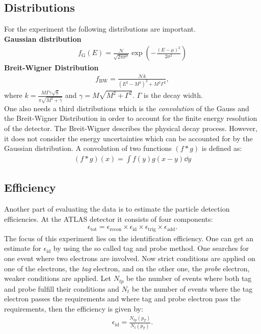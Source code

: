 \documentclass[12pt, a4paper, bibliography=totoc]{scrartcl}
\begin{document}
\begin{multicols}{2}
\subsection{Distributions}
For the experiment the following distributions are important.\\
\textbf{Gaussian distribution}
\begin{align}
    f_{\text{G}} (E) = \frac{\mathcal{N}}{\sqrt{2 \pi \sigma^2}} \exp \left( - \frac{(E - \mu )^2}{2 \sigma^2} \right)
\end{align}
\textbf{Breit-Wigner Distribution}
\begin{align}
    f_{\text{BW}} = \frac{\mathcal{N} k}{(E^2 - M^2)^2 + M^2 \Gamma^2} ,
\end{align}
where $k = \frac{M\Gamma \gamma \sqrt{8}}{\pi \sqrt{M^2 + \gamma}}$ and $\gamma = M \sqrt{M^2 + \Gamma^2}$. $\Gamma$ is the decay width.\\
One also needs a third distributions which is the \textit{convolution} of the Gauss and the Breit-Wigner Distribution in order to account for the finite energy resolution of the detector. 
The Breit-Wigner describes the physical decay process. 
However, it does not consider the energy uncertainties which can be accounted for by the Gaussian distribution.
A convolution of two functions $(f \ast g)$ is defined as:
\begin{align}
    (f \ast g) (x) = \int f(y)g(x-y)\dd y
\end{align}

\subsection{Efficiency}
Another part of evaluating the data is to estimate the particle detection efficiencies.
At the ATLAS detector it consists of four components:
\begin{align}
     \epsilon_{\text{tot}} =  \epsilon_{\text{recon}} \times \epsilon_{\text{id}} \times \epsilon_{\text{trig}} \times \epsilon_{\text{add}}  .
\end{align}
The focus of this experiment lies on the identification efficiency.
One can get an estimate for $\epsilon_{\text{id}}$ by using the so called tag and probe method.
One searches for one event where two electrons are involved. 
Now strict conditions are applied on one of the electrons, the \textit{tag} electron, 
and on the other one, the \textit{probe} electron, weaker conditions are applied.
Let $N_{tp}$ be the number of events where both tag and probe fulfill their conditions and $N_t$ be the number of events where the tag electron passes the requirements and where tag and probe electron pass the requirements, then the efficiency is given by:
\begin{align}
    \epsilon_{\text{id}} = \frac{N_{tp} (p_T)}{N_t(p_T)}.
\end{align}



\end{multicols}
\end{document}

